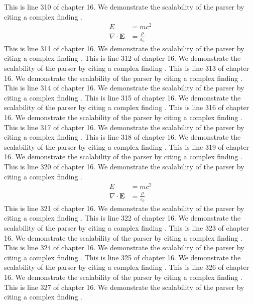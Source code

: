 This is line 310 of chapter 16. We demonstrate the scalability of the parser by citing a complex finding \cite{ref16_310}.
\begin{align*}
  E &= mc^2 \\
  \nabla \cdot \mathbf{E} &= \frac{\rho}{\varepsilon_0}
\end{align*}
This is line 311 of chapter 16. We demonstrate the scalability of the parser by citing a complex finding \cite{ref16_311}.
This is line 312 of chapter 16. We demonstrate the scalability of the parser by citing a complex finding \cite{ref16_312}.
This is line 313 of chapter 16. We demonstrate the scalability of the parser by citing a complex finding \cite{ref16_313}.
This is line 314 of chapter 16. We demonstrate the scalability of the parser by citing a complex finding \cite{ref16_314}.
This is line 315 of chapter 16. We demonstrate the scalability of the parser by citing a complex finding \cite{ref16_315}.
This is line 316 of chapter 16. We demonstrate the scalability of the parser by citing a complex finding \cite{ref16_316}.
This is line 317 of chapter 16. We demonstrate the scalability of the parser by citing a complex finding \cite{ref16_317}.
This is line 318 of chapter 16. We demonstrate the scalability of the parser by citing a complex finding \cite{ref16_318}.
This is line 319 of chapter 16. We demonstrate the scalability of the parser by citing a complex finding \cite{ref16_319}.
This is line 320 of chapter 16. We demonstrate the scalability of the parser by citing a complex finding \cite{ref16_320}.
\begin{align*}
  E &= mc^2 \\
  \nabla \cdot \mathbf{E} &= \frac{\rho}{\varepsilon_0}
\end{align*}
This is line 321 of chapter 16. We demonstrate the scalability of the parser by citing a complex finding \cite{ref16_321}.
This is line 322 of chapter 16. We demonstrate the scalability of the parser by citing a complex finding \cite{ref16_322}.
This is line 323 of chapter 16. We demonstrate the scalability of the parser by citing a complex finding \cite{ref16_323}.
This is line 324 of chapter 16. We demonstrate the scalability of the parser by citing a complex finding \cite{ref16_324}.
This is line 325 of chapter 16. We demonstrate the scalability of the parser by citing a complex finding \cite{ref16_325}.
This is line 326 of chapter 16. We demonstrate the scalability of the parser by citing a complex finding \cite{ref16_326}.
This is line 327 of chapter 16. We demonstrate the scalability of the parser by citing a complex finding \cite{ref16_327}.
